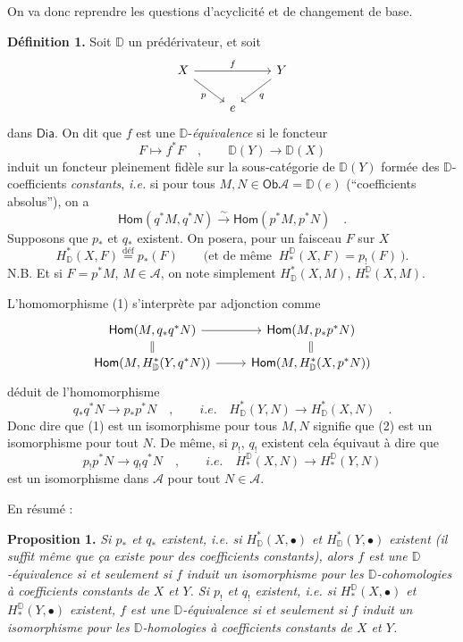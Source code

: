 \documentclass[11pt,leqno]{article}
\newcommand{\printedpage}[1]{\marginpar{\footnotesize p.~#1}}
\newcommand{\msp}[1]{\marginpar{\footnotesize [#1]}}
\newcommand{\DD}{\mathbb{D}}
\newcommand{\cA}{\mathcal{A}}
\newcommand{\Dia}{\mathsf{Dia}}
\newcommand{\Ob}{\mathsf{Ob}}
\newcommand{\Hom}{\mathsf{Hom}}
\newcommand{\isolongto}{\overset{\sim}{\longrightarrow}}
\begin{document}
On va donc reprendre les questions d'acyclicité et de changement de base.

\noindent\textbf{Définition 1.} Soit $\DD$ un prédérivateur, et soit
\[
\begin{tikzcd}
X \arrow[rr, "f"] \arrow[dr, "p"'] & & Y \arrow[dl, "q"] \\
& e &
\end{tikzcd}
\]
dans $\Dia$. On dit que $f$ est une $\DD$-\textit{équivalence} si le foncteur
\[
F \longmapsto f^*F \quad , \qquad \DD(Y) \longrightarrow \DD(X)
\]
induit un foncteur pleinement fidèle sur la sous-catégorie de $\DD(Y)$ formée des $\DD$-coefficients \textit{constants}, \textit{i.e.} si pour tous $M, N \in \Ob \cA = \DD(e)$ (“coefficients absolus”), on a
\[
\Hom(q^*M, q^*N) \isolongto \Hom(p^*M, p^*N) \quad . \tag*{(1)}
\]
Supposons que $p_*$ et $q_*$ existent. On posera, pour un faisceau $F$ sur $X$
\[
H^*_{\DD}(X, F) \overset{\text{déf}}{=} p_*(F) \qquad \text{(et de même } \ H^{\DD}_*(X, F) = p_!(F) \ \text{).}
\]
N.B. Et si $F = p^*M$, $M \in \cA$, on note simplement $H^*_{\DD}(X, M)$, $H^{\DD}_*(X, M)$.

\noindent L'homomorphisme (1) s'interprète par adjonction comme
\[
\begin{tikzcd}[row sep=small]
\Hom(M, q_*q^*N) \arrow[r] \arrow[d, equal] & \Hom(M, p_*p^*N) \arrow[d, equal] \\
\Hom(M, H^*_{\DD}(Y, q^*N)) \arrow[r] & \Hom(M, H^*_{\DD}(X, p^*N))
\end{tikzcd}
\]
déduit de l'homomorphisme
\[
q_*q^*N \longrightarrow p_*p^*N \quad , \qquad \textit{i.e.} \quad H^*_{\DD}(Y, N) \longrightarrow H^*_{\DD}(X, N) \quad . \tag*{(2)}
\]
Donc dire que (1) est un isomorphisme pour tous $M, N$ signifie que (2) est un isomorphisme pour tout $N$. De même, si $p_!$, $q_!$ existent cela équivaut à dire que
\[
p_!p^*N \longrightarrow q_!q^*N \quad , \qquad \textit{i.e.} \quad H^{\DD}_*(X, N) \longrightarrow H^{\DD}_*(Y, N) \tag*{$(2')$}
\]
est un isomorphisme dans $\cA$ pour tout $N \in \cA$.

\clearpage
\printedpage{36}
\noindent\msp{page 62}

\noindent En résumé :

\noindent\textbf{Proposition 1.} \textit{Si $p_*$ et $q_*$ existent, i.e. si $H^*_{\DD}(X, \bullet)$ et $H^*_{\DD}(Y, \bullet)$ existent (il suffit même que ça existe pour des coefficients constants), alors $f$ est une $\DD$-équivalence si et seulement si $f$ induit un isomorphisme pour les $\DD$-cohomologies à coefficients constants de $X$ et $Y$. Si $p_!$ et $q_!$ existent, i.e. si $H^{\DD}_*(X, \bullet)$ et $H^{\DD}_*(Y, \bullet)$ existent, $f$ est une $\DD$-équivalence si et seulement si $f$ induit un isomorphisme pour les $\DD$-homologies à coefficients constants de $X$ et $Y$.}
\end{document}
